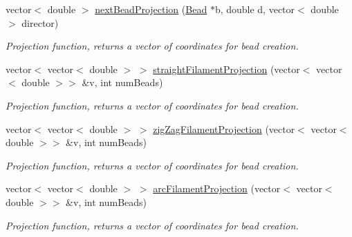 {\bf }\par
\begin{DoxyCompactItemize}
\item 
vector$<$ double $>$ \hyperlink{classFilament_a96e6a97434a442014b199cd7623d2291}{next\+Bead\+Projection} (\hyperlink{classBead}{Bead} $\ast$b, double d, vector$<$ double $>$ director)
\begin{DoxyCompactList}\small\item\em Projection function, returns a vector of coordinates for bead creation. \end{DoxyCompactList}\item 
vector$<$ vector$<$ double $>$ $>$ \hyperlink{classFilament_ade0776033b4e56f8035eda23c03887fa}{straight\+Filament\+Projection} (vector$<$ vector$<$ double $>$$>$ \&v, int num\+Beads)
\begin{DoxyCompactList}\small\item\em Projection function, returns a vector of coordinates for bead creation. \end{DoxyCompactList}\item 
vector$<$ vector$<$ double $>$ $>$ \hyperlink{classFilament_a4809abeefb15e0009e246d4d4051ae7c}{zig\+Zag\+Filament\+Projection} (vector$<$ vector$<$ double $>$$>$ \&v, int num\+Beads)
\begin{DoxyCompactList}\small\item\em Projection function, returns a vector of coordinates for bead creation. \end{DoxyCompactList}\item 
vector$<$ vector$<$ double $>$ $>$ \hyperlink{classFilament_aa552f866d4c2db6e987fa0b56e65f060}{arc\+Filament\+Projection} (vector$<$ vector$<$ double $>$$>$ \&v, int num\+Beads)
\begin{DoxyCompactList}\small\item\em Projection function, returns a vector of coordinates for bead creation. \end{DoxyCompactList}\end{DoxyCompactItemize}

